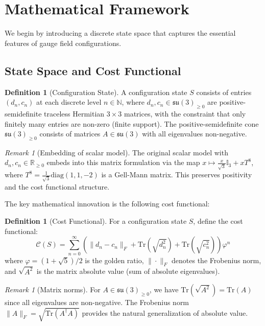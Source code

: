 \documentclass[11pt]{article}
\numberwithin{equation}{section}
\theoremstyle{definition}
\newtheorem{definition}[theorem]{Definition}
\theoremstyle{remark}
\newtheorem{remark}[theorem]{Remark}
\begin{document}
\section{Mathematical Framework}
\label{sec:framework}

We begin by introducing a discrete state space that captures the essential features of gauge field configurations.

\subsection{State Space and Cost Functional}

\begin{definition}[Configuration State]
A configuration state $S$ consists of entries $(d_n, c_n)$ at each discrete level $n \in \mathbb{N}$, where $d_n, c_n \in \mathfrak{su}(3)_{\geq 0}$ are positive-semidefinite traceless Hermitian $3 \times 3$ matrices, with the constraint that only finitely many entries are non-zero (finite support). The positive-semidefinite cone $\mathfrak{su}(3)_{\geq 0}$ consists of matrices $A \in \mathfrak{su}(3)$ with all eigenvalues non-negative.
\end{definition}

\begin{remark}[Embedding of scalar model]
The original scalar model with $d_n, c_n \in \mathbb{R}_{\geq 0}$ embeds into this matrix formulation via the map $x \mapsto \frac{x}{\sqrt{3}} \mathbb{I}_3 + x T^8$, where $T^8 = \frac{1}{\sqrt{3}}\text{diag}(1,1,-2)$ is a Gell-Mann matrix. This preserves positivity and the cost functional structure.
\end{remark}

The key mathematical innovation is the following cost functional:

\begin{definition}[Cost Functional]
For a configuration state $S$, define the cost functional:
\begin{equation}
\mathcal{C}(S) = \sum_{n=0}^{\infty} \left(\|d_n - c_n\|_F + \text{Tr}(\sqrt{d_n^2}) + \text{Tr}(\sqrt{c_n^2})\right) \varphi^n
\end{equation}
where $\varphi = (1+\sqrt{5})/2$ is the golden ratio, $\|\cdot\|_F$ denotes the Frobenius norm, and $\sqrt{A^2}$ is the matrix absolute value (sum of absolute eigenvalues).
\end{definition}

\begin{remark}[Matrix norms]
For $A \in \mathfrak{su}(3)_{\geq 0}$, we have $\text{Tr}(\sqrt{A^2}) = \text{Tr}(A)$ since all eigenvalues are non-negative. The Frobenius norm $\|A\|_F = \sqrt{\text{Tr}(A^\dagger A)}$ provides the natural generalization of absolute value.
\end{remark}
\end{document}
